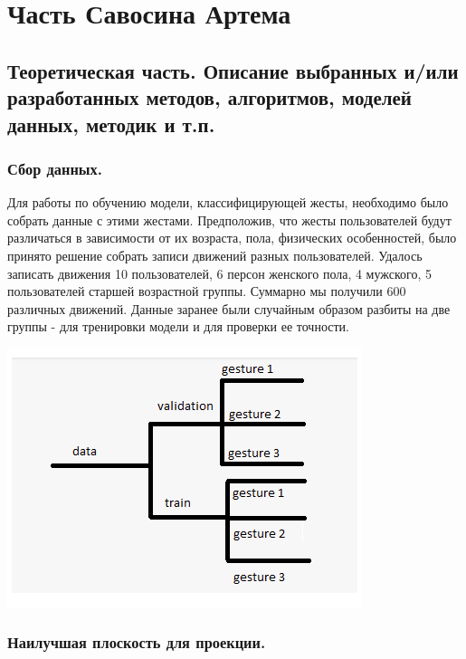 
\section{Часть Савосина Артема}



\subsection{Теоретическая часть. Описание выбранных и/или разработанных методов, алгоритмов, моделей данных, методик и т.п.}

\subsubsection{Сбор данных.}
Для работы по обучению модели, классифицирующей жесты, необходимо было собрать данные с этими жестами. Предположив, что жесты пользователей будут различаться в зависимости от их возраста, пола, физических особенностей, было принято решение собрать записи движений разных пользователей. Удалось записать движения 10 пользователей, 6 персон женского пола, 4 мужского, 5 пользователей старшей возрастной группы.
Суммарно мы получили 600 различных движений.
Данные заранее были случайным образом разбиты на две группы - для тренировки модели и для проверки ее точности.

\includegraphics[scale = 1]{images_sav/data.png}

\subsubsection{Наилучшая плоскость для проекции.}

